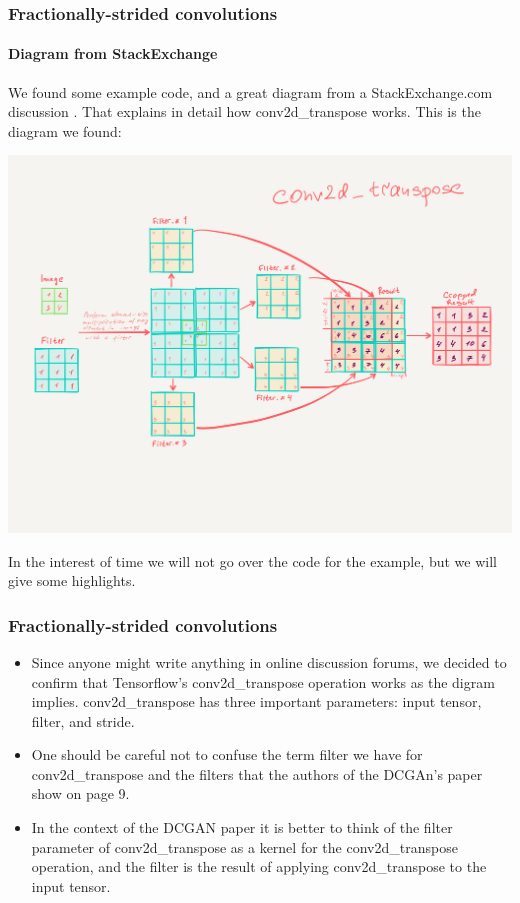 \documentclass{beamer}
\begin{document}

\begin{frame}[allowframebreaks]
\frametitle{Fractionally-strided convolutions}
\framesubtitle{Diagram from StackExchange \cite{stackExConv}}
We found some example code, and a great diagram from a StackExchange.com discussion 
\cite{stackExConv}. That explains in detail how conv2d\_transpose works.
This is the diagram we found:

\includegraphics[scale=0.25] {conv2d_transpose-example}


In the interest of time we will not go over the code for the example, but we
will give some highlights.

\end{frame}

\begin{frame}[allowframebreaks]
\frametitle{Fractionally-strided convolutions}
\begin{itemize}
\item Since anyone might write anything in online discussion forums, we decided to 
confirm that Tensorflow's conv2d\_transpose operation works as the digram implies.
conv2d\_transpose has three important parameters: input tensor, 
filter, and stride. 

\item One should be careful not to confuse the term filter we
have for conv2d\_transpose and the filters that the authors of the DCGAn's paper
show on page 9. 

\item In the context of the DCGAN paper it is better to think of the filter
parameter of conv2d\_transpose  as a kernel for the conv2d\_transpose operation,
and the filter is the result of applying conv2d\_transpose to the input tensor. 
\end{itemize}
\end{frame}
\end{document}
